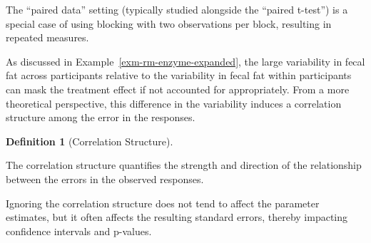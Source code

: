 \documentclass[
  letterpaper,
  DIV=11,
  numbers=noendperiod]{scrreprt}
\theoremstyle{definition}
\newtheorem{definition}{Definition}[chapter]
\theoremstyle{definition}
\theoremstyle{remark}
\begin{document}
\begin{tcolorbox}[enhanced jigsaw, left=2mm, toprule=.15mm, arc=.35mm, breakable, opacitybacktitle=0.6, opacityback=0, rightrule=.15mm, colbacktitle=quarto-callout-note-color!10!white, coltitle=black, leftrule=.75mm, toptitle=1mm, colframe=quarto-callout-note-color-frame, titlerule=0mm, title=\textcolor{quarto-callout-note-color}{\faInfo}\hspace{0.5em}{Note}, bottomrule=.15mm, colback=white, bottomtitle=1mm]

The ``paired data'' setting (typically studied alongside the ``paired
t-test'') is a special case of using blocking with two observations per
block, resulting in repeated measures.

\end{tcolorbox}

As discussed in Example~\ref{exm-rm-enzyme-expanded}, the large
variability in fecal fat across participants relative to the variability
in fecal fat within participants can mask the treatment effect if not
accounted for appropriately. From a more theoretical perspective, this
difference in the variability induces a correlation structure among the
error in the responses.

\begin{definition}[Correlation
Structure]\protect\hypertarget{def-correlation-structure}{}\label{def-correlation-structure}

The correlation structure quantifies the strength and direction of the
relationship between the errors in the observed responses.

\end{definition}

\begin{tcolorbox}[enhanced jigsaw, left=2mm, toprule=.15mm, arc=.35mm, breakable, opacitybacktitle=0.6, opacityback=0, rightrule=.15mm, colbacktitle=quarto-callout-tip-color!10!white, coltitle=black, leftrule=.75mm, toptitle=1mm, colframe=quarto-callout-tip-color-frame, titlerule=0mm, title=\textcolor{quarto-callout-tip-color}{\faLightbulb}\hspace{0.5em}{Big Idea}, bottomrule=.15mm, colback=white, bottomtitle=1mm]

Ignoring the correlation structure does not tend to affect the parameter
estimates, but it often affects the resulting standard errors, thereby
impacting confidence intervals and p-values.

\end{tcolorbox}
\end{document}
